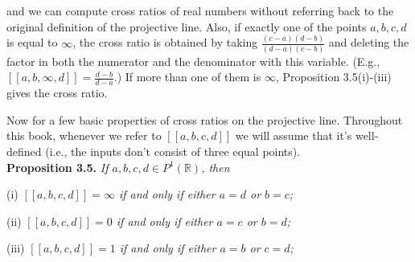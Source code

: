 \documentclass[leqno]{book}
\begin{document}
\noindent and we can compute cross ratios of real numbers without referring back to the original definition of the projective line.  Also, if exactly one of the points $a,b,c,d$ is equal to $\infty$, the cross ratio is obtained by taking $\frac{(c-a)(d-b)}{(d-a)(c-b)}$ and deleting the factor in both the numerator and the denominator with this variable.  (E.g., $[\![a,b,\infty,d]\!]=\frac{d-b}{d-a}$.)  If more than one of them is $\infty$, Proposition 3.5(i)-(iii) gives the cross ratio.

Now for a few basic properties of cross ratios on the projective line.  Throughout this book, whenever we refer to $[\![a,b,c,d]\!]$ we will assume that it's well-defined (i.e., the inputs don't consist of three equal points).\\

\noindent\textbf{Proposition 3.5.} \emph{If $a,b,c,d\in P^1(\mathbb R)$, then}

(i) \emph{$[\![a,b,c,d]\!]=\infty$ if and only if either $a=d$ or $b=c$;}

(ii) \emph{$[\![a,b,c,d]\!]=0$ if and only if either $a=c$ or $b=d$;}

(iii) \emph{$[\![a,b,c,d]\!]=1$ if and only if either $a=b$ or $c=d$;}
\end{document}
